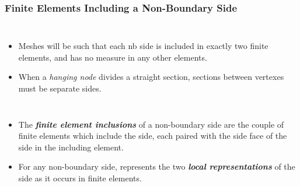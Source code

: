 \documentclass[compress]{beamer}
\begin{document}
\begin{frame}
  \frametitle{Finite Elements Including a Non-Boundary Side}
  \begin{columns}
      \begin{itemize}[<+->]
        \item Meshes will be such that each nb side is included in exactly two finite elements,
          and has no measure in any other elements.
        \item When a \emph{hanging node} divides a straight section, sections between vertexes must be separate sides.
      \end{itemize}
     {
      } {
         {}
                 {}
      }
  \end{columns}
  \begin{itemize}[<+->]
    \item The \emph{\textbf{finite element inclusions}} of a non-boundary side are the couple of finite elements which include the side,
      each paired with the side face of the side in the including element.
    \item For any non-boundary side, represents the two \emph{\textbf{local representations}} of the side as it occurs in finite elements.
  \end{itemize}
\end{frame}
\end{document}
